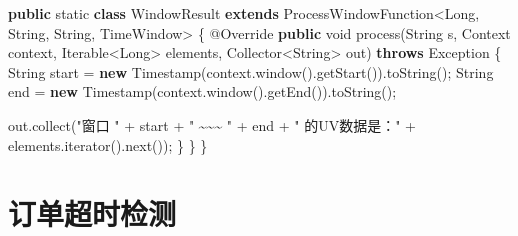 \documentclass[cn,11pt,chinese]{elegantbook}
\newenvironment{Shaded}{}{}
\newcommand{\AttributeTok}[1]{\textcolor[rgb]{0.49,0.56,0.16}{#1}}
\newcommand{\BuiltInTok}[1]{#1}
\newcommand{\DataTypeTok}[1]{\textcolor[rgb]{0.56,0.13,0.00}{#1}}
\newcommand{\FunctionTok}[1]{\textcolor[rgb]{0.02,0.16,0.49}{#1}}
\newcommand{\KeywordTok}[1]{\textcolor[rgb]{0.00,0.44,0.13}{\textbf{#1}}}
\newcommand{\NormalTok}[1]{#1}
\newcommand{\StringTok}[1]{\textcolor[rgb]{0.25,0.44,0.63}{#1}}
\begin{document}
\begin{Shaded}
\begin{Highlighting}[]
    \KeywordTok{public} \DataTypeTok{static} \KeywordTok{class}\NormalTok{ WindowResult }\KeywordTok{extends}\NormalTok{ ProcessWindowFunction\textless{}}\BuiltInTok{Long}\NormalTok{, }\BuiltInTok{String}\NormalTok{, }\BuiltInTok{String}\NormalTok{, TimeWindow\textgreater{} \{}
        \AttributeTok{@Override}
        \KeywordTok{public} \DataTypeTok{void} \FunctionTok{process}\NormalTok{(}\BuiltInTok{String}\NormalTok{ s, }\BuiltInTok{Context}\NormalTok{ context, }\BuiltInTok{Iterable}\NormalTok{\textless{}}\BuiltInTok{Long}\NormalTok{\textgreater{} elements, Collector\textless{}}\BuiltInTok{String}\NormalTok{\textgreater{} out) }\KeywordTok{throws} \BuiltInTok{Exception}\NormalTok{ \{}
            \BuiltInTok{String}\NormalTok{ start = }\KeywordTok{new} \BuiltInTok{Timestamp}\NormalTok{(context.}\FunctionTok{window}\NormalTok{().}\FunctionTok{getStart}\NormalTok{()).}\FunctionTok{toString}\NormalTok{();}
            \BuiltInTok{String}\NormalTok{ end = }\KeywordTok{new} \BuiltInTok{Timestamp}\NormalTok{(context.}\FunctionTok{window}\NormalTok{().}\FunctionTok{getEnd}\NormalTok{()).}\FunctionTok{toString}\NormalTok{();}

\NormalTok{            out.}\FunctionTok{collect}\NormalTok{(}\StringTok{"窗口 "}\NormalTok{ + start + }\StringTok{" \textasciitilde{}\textasciitilde{}\textasciitilde{} "}\NormalTok{ + end + }\StringTok{" 的UV数据是："}\NormalTok{ + elements.}\FunctionTok{iterator}\NormalTok{().}\FunctionTok{next}\NormalTok{());}
\NormalTok{        \}}
\NormalTok{    \}}
\NormalTok{\}}
\end{Highlighting}
\end{Shaded}

\hypertarget{ux8ba2ux5355ux8d85ux65f6ux68c0ux6d4b}{%
\section{订单超时检测}\label{ux8ba2ux5355ux8d85ux65f6ux68c0ux6d4b}}
\end{document}
